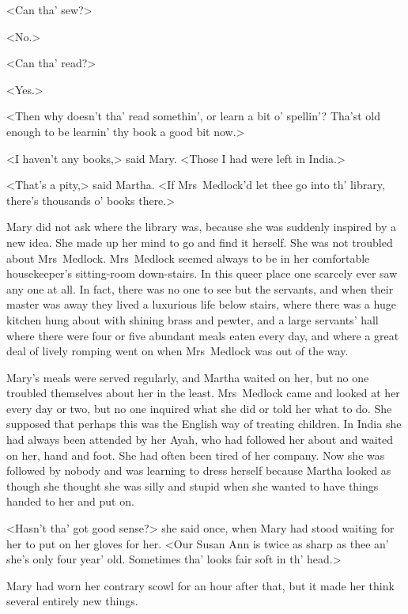 <Can tha' sew?>

<No.>

<Can tha' read?>

<Yes.>

<Then why doesn't tha' read somethin', or learn a bit o' spellin'? Tha'st old enough to be learnin' thy book a good bit now.>

<I haven't any books,> said Mary. <Those I had were left in India.>

<That's a pity,> said Martha. <If Mrs~Medlock'd let thee go into th' library, there's thousands o' books there.>

Mary did not ask where the library was, because she was suddenly inspired by a new idea. She made up her mind to go and find it herself. She was not troubled about Mrs~Medlock. Mrs~Medlock seemed always to be in her comfortable housekeeper's sitting-room down-stairs. In this queer place one scarcely ever saw any one at all. In fact, there was no one to see but the servants, and when their master was away they lived a luxurious life below stairs, where there was a huge kitchen hung about with shining brass and pewter, and a large servants' hall where there were four or five abundant meals eaten every day, and where a great deal of lively romping went on when Mrs~Medlock was out of the way.

Mary's meals were served regularly, and Martha waited on her, but no one troubled themselves about her in the least. Mrs~Medlock came and looked at her every day or two, but no one inquired what she did or told her what to do. She supposed that perhaps this was the English way of treating children. In India she had always been attended by her Ayah, who had followed her about and waited on her, hand and foot. She had often been tired of her company. Now she was followed by nobody and was learning to dress herself because Martha looked as though she thought she was silly and stupid when she wanted to have things handed to her and put on.

<Hasn't tha' got good sense?> she said once, when Mary had stood waiting for her to put on her gloves for her. <Our Susan Ann is twice as sharp as thee an' she's only four year' old. Sometimes tha' looks fair soft in th' head.>

Mary had worn her contrary scowl for an hour after that, but it made her think several entirely new things.


